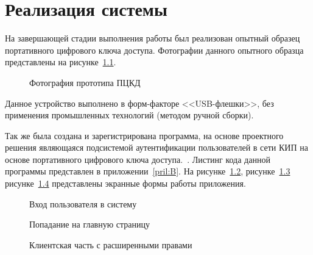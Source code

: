 \chapter{Реализация системы}

На завершающей стадии выполнения работы был реализован опытный образец
портативного цифрового ключа доступа. Фотографии данного опытного
образца представлены на рисунке~\ref{ris:4.0.1}.

\begin{figure}[ht]
\begin{center}

\begin{minipage} [h]{0.8\linewidth}
\end{minipage}
\hfill
\begin{minipage} [h]{0.8\linewidth}

\end{minipage}
\end{center}
\caption{Фотография прототипа ПЦКД}
\label{ris:4.0.1}
\end{figure}

Данное устройство выполнено в форм-факторе <<USB-флешки>>,
без применения промышленных технологий (методом ручной сборки).

Так же была создана и зарегистрирована программа, на основе проектного решения
являющаяся подсистемой аутентификации пользователей в сети КИП на основе
портативного цифрового ключа доступа.~\cite{svidetelstvo_auth}. Листинг кода
данной программы представлен в приложении~\ref{pril:B}. На
рисунке~\ref{ris:4.0.3}, рисунке~\ref{ris:4.0.4}
рисунке~\ref{ris:4.0.5} представлены экранные формы работы приложения.

\begin{figure}[ht]
\center{\texttt{[image: 4-0-3]}}
\caption{Вход пользователя в систему}
\label{ris:4.0.3}
\end{figure}

\begin{figure}[ht]
\center{\texttt{[image: 4-0-4]}}
\caption{Попадание на главную страницу}
\label{ris:4.0.4}
\end{figure}

\begin{figure}[ht]
\center{\texttt{[image: 4-0-5]}}
\caption{Клиентская часть с расширенными правами}
\label{ris:4.0.5}
\end{figure}


